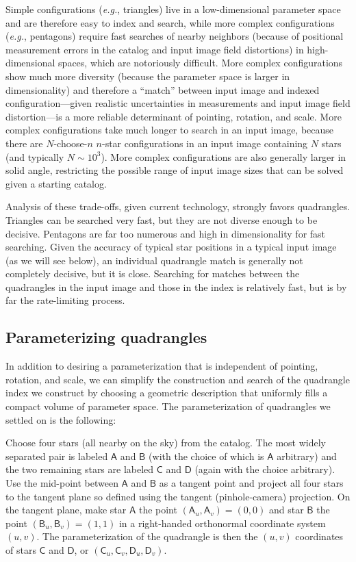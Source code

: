 \documentclass[12pt,preprint]{aastex}
\newcommand{\latin}[1]{\textit{#1}}
\newcommand{\eg}{\latin{e.g.}}
\newcommand{\starlabel}[1]{\mathsf{#1}}
\newcommand{\AAA}{\starlabel{A}}
\newcommand{\BBB}{\starlabel{B}}
\newcommand{\CCC}{\starlabel{C}}
\newcommand{\DDD}{\starlabel{D}}
\begin{document}
Simple configurations (\eg, triangles) live in a low-dimensional
parameter space and are therefore easy to index and search, while more
complex configurations (\eg, pentagons) require fast searches of
nearby neighbors (because of positional measurement errors in the
catalog and input image field distortions) in high-dimensional spaces,
which are notoriously difficult.  More complex configurations show
much more diversity (because the parameter space is larger in
dimensionality) and therefore a ``match'' between input image and
indexed configuration---given realistic uncertainties in measurements
and input image field distortion---is a more reliable determinant of
pointing, rotation, and scale.  More complex configurations take much
longer to search in an input image, because there are $N$-choose-$n$
$n$-star configurations in an input image containing $N$ stars (and
typically $N\sim 10^3$).  More complex configurations are also
generally larger in solid angle, restricting the possible range of
input image sizes that can be solved given a starting catalog.

Analysis of these trade-offs, given current technology, strongly
favors quadrangles.  Triangles can be searched very fast, but they are
not diverse enough to be decisive.  Pentagons are far too numerous and
high in dimensionality for fast searching.  Given the accuracy of
typical star positions in a typical input image (as we will see
below), an individual quadrangle match is generally not completely
decisive, but it is close.  Searching for matches between the
quadrangles in the input image and those in the index is relatively
fast, but is by far the rate-limiting process.

\subsection{Parameterizing quadrangles}

In addition to desiring a parameterization that is independent of
pointing, rotation, and scale, we can simplify the construction and
search of the quadrangle index we construct by choosing a geometric
description that uniformly fills a compact volume of parameter space.
The parameterization of quadrangles we settled on is the following:

Choose four stars (all nearby on the sky) from the catalog.  The most
widely separated pair is labeled $\AAA$ and $\BBB$ (with the choice of
which is $\AAA$ arbitrary) and the two remaining stars are labeled
$\CCC$ and $\DDD$ (again with the choice arbitrary).  Use the
mid-point between $\AAA$ and $\BBB$ as a tangent point and project all
four stars to the tangent plane so defined using the tangent
(pinhole-camera) projection.  On the tangent plane, make star $\AAA$
the point $(\AAA_u,\AAA_v)=(0,0)$ and star $\BBB$ the point
$(\BBB_u,\BBB_v)=(1,1)$ in a right-handed orthonormal coordinate
system $(u,v)$.  The parameterization of the quadrangle is then the
$(u,v)$ coordinates of stars $\CCC$ and $\DDD$, or
$(\CCC_u,\CCC_v,\DDD_u,\DDD_v)$.
\end{document}
